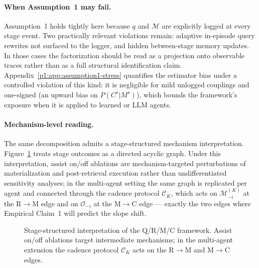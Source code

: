 \documentclass{article}
\begin{document}
\paragraph{When Assumption~1 may fail.}
Assumption~1 holds tightly here because $q$ and $\mathcal{M}$ are
explicitly logged at every stage event. Two practically relevant
violations remain: adaptive in-episode query rewrites not surfaced to
the logger, and hidden between-stage memory updates. In those cases
the factorization should be read as a projection onto observable
traces rather than as a full structural identification claim.
Appendix~\ref{p1:app:assumption1-stress} quantifies the estimator bias
under a controlled violation of this kind: it is negligible for mild
unlogged couplings and one-signed (an upward bias on
$P(C^\star|M^\star)$), which bounds the framework's exposure when it is
applied to learned or LLM agents.

\paragraph{Mechanism-level reading.}
The same decomposition admits a stage-structured mechanism
interpretation. Figure~\ref{p1:fig:causal} treats stage outcomes as a
directed acyclic graph. Under this interpretation, assist on/off
ablations are mechanism-targeted perturbations of materialization and
post-retrieval execution rather than undifferentiated sensitivity
analyses; in the multi-agent setting the same graph is replicated per
agent and connected through the cadence protocol $\mathcal{C}_K$,
which acts on $\mathcal{M}_{-i}^{(K)}$ at the R$\to$M edge and on
$\mathcal{O}_{-i}$ at the M$\to$C edge --- exactly the two edges where
Empirical Claim~1 will predict the slope shift.

\begin{figure}[t]
  \centering
  \caption{Stage-structured interpretation of the Q/R/M/C framework. Assist on/off ablations target intermediate mechanisms; in the multi-agent extension the cadence protocol $\mathcal{C}_K$ acts on the R$\to$M and M$\to$C edges.}
  \label{p1:fig:causal}
\end{figure}
\end{document}

